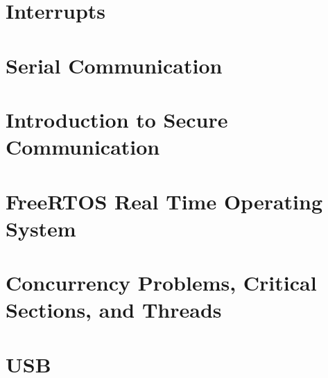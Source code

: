 \documentclass[letterpaper]{book}
\begin{document}
\chapter{Interrupts}
    
\chapter{Serial Communication}
    
%     
\chapter{Introduction to Secure Communication}
    
%     
\chapter{FreeRTOS Real Time Operating System}
     
\chapter{Concurrency Problems, Critical Sections, and Threads}
    
\chapter{USB}
    
\end{document}
